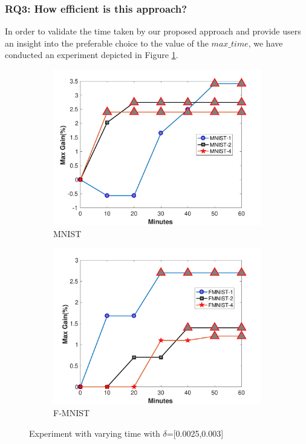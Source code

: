 \subsubsection{\textbf{RQ3: How efficient is this approach?}}
In order to validate the time taken by our proposed approach and provide users an insight into the preferable choice to the value of the $max\_time$, we have conducted an experiment depicted in Figure \ref{fig:time}. 
\begin{figure}
	\begin{subfigure}[b]{.46\linewidth}{}
		\includegraphics[keepaspectratio = True, scale = 0.31]{figures/MNIST_time}
		\centering
		\caption{MNIST}
	\end{subfigure}
	\begin{subfigure}[b]{.46\linewidth}
		\includegraphics[keepaspectratio = True, scale = 0.31]{figures/FMNIST_time}
		\caption{F-MNIST}
	\end{subfigure}
	\caption{Experiment with varying time with $\delta$=[0.0025,0.003]}
	\label{fig:time}
\end{figure}

